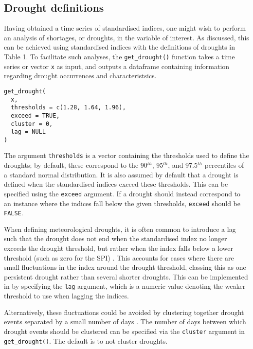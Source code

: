 \subsection{Drought definitions}\label{drought-definitions}

Having obtained a time series of standardised indices, one might wish to perform an analysis of shortages, or droughts, in the variable of interest. As discussed, this can be achieved using standardised indices with the definitions of droughts in Table 1. To facilitate such analyses, the \texttt{get\_drought()} function takes a time series or vector \texttt{x} as input, and outputs a dataframe containing information regarding drought occurrences and characteristsics.

\begin{verbatim}
get_drought(
  x,
  thresholds = c(1.28, 1.64, 1.96),
  exceed = TRUE,
  cluster = 0,
  lag = NULL
)
\end{verbatim}

The argument \texttt{thresholds} is a vector containing the thresholds used to define the droughts; by default, these correspond to the 90\(^{th}\), 95\(^{th}\), and 97.5\(^{th}\) percentiles of a standard normal distribution. It is also assumed by default that a drought is defined when the standardised indices exceed these thresholds. This can be specified using the \texttt{exceed} argument. If a drought should instead correspond to an instance where the indices fall below the given thresholds, \texttt{exceed} should be \texttt{FALSE}.

When defining meteorological droughts, it is often common to introduce a lag such that the drought does not end when the standardised index no longer exceeds the drought threshold, but rather when the index falls below a lower threshold (such as zero for the SPI) \citep[e.g.][]{MckeeEtAl1993}. This accounts for cases where there are small fluctuations in the index around the drought threshold, classing this as one persistent drought rather than several shorter droughts. This can be implemented in  by specifying the \texttt{lag} argument, which is a numeric value denoting the weaker threshold to use when lagging the indices.

Alternatively, these fluctuations could be avoided by clustering together drought events separated by a small number of days \citep[e.g.][]{OteroEtAl2022}. The number of days between which drought events should be clustered can be specified via the \texttt{cluster} argument in \texttt{get\_drought()}. The default is to not cluster droughts.

